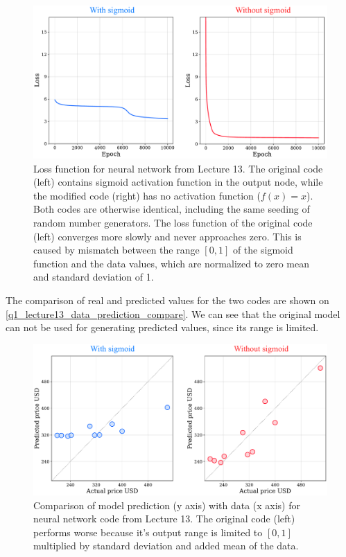 \begin{figure}[H]
  \centering
  \includegraphics[width=1\textwidth]{figures/lecture13_loss_compared.pdf}
  \caption{Loss function for neural network from Lecture 13. The original code (left) contains sigmoid activation function in the output node, while the modified code (right) has no activation function ($f(x) = x$). Both codes are otherwise identical, including the same seeding of random number generators. The loss function of the original code (left) converges more slowly and never approaches zero. This is caused by mismatch between the range $[0, 1]$ of the sigmoid function and the data values, which are normalized to zero mean and standard deviation of 1.}
  \label{q1_lecture13_loss_compare}
\end{figure}

The comparison of real and predicted values for the two codes are shown on \autoref{q1_lecture13_data_prediction_compare}. We can see that the original model can not be used for generating predicted values, since its range is limited.

\begin{figure}[H]
  \centering
  \includegraphics[width=1\textwidth]{figures/lecture13_results_compared.pdf}
  \caption{Comparison of model prediction (y axis) with data (x axis) for neural network code from Lecture 13. The original code (left) performs worse because it's output range is limited to $[0, 1]$ multiplied by standard deviation and added mean of the data.}
  \label{q1_lecture13_data_prediction_compare}
\end{figure}



